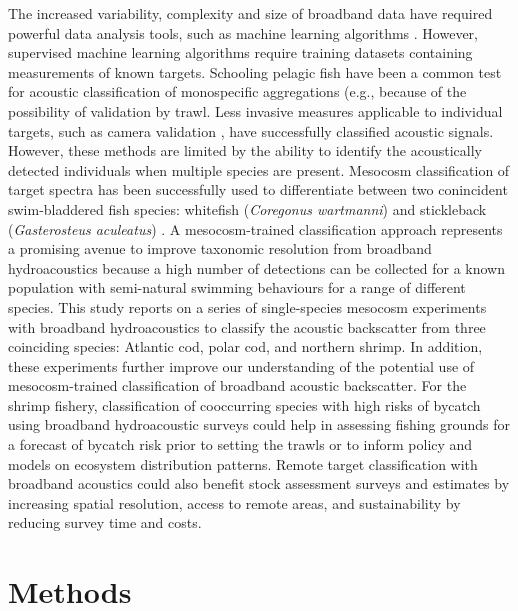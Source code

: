 The increased variability, complexity and size of broadband data have required powerful data analysis tools, such as machine learning algorithms \citep{Malde2020}. However, supervised machine learning algorithms require training datasets containing measurements of known targets. Schooling pelagic fish have been a common test for acoustic classification of monospecific aggregations (e.g., \citealt{Bassett2018, Brautaset2020, Fernandes2009} because of the possibility of validation by trawl. Less invasive measures applicable to individual targets, such as camera validation \citep{BenoitBird2020}, have successfully classified acoustic signals. However, these methods are limited by the ability to identify the acoustically detected individuals when multiple species are present. Mesocosm classification of target spectra has been successfully used to differentiate between two conincident swim-bladdered fish species: whitefish (\textit{Coregonus wartmanni}) and stickleback (\textit{Gasterosteus aculeatus}) \citep{Gugele2021}. A mesocosm-trained classification approach represents a promising avenue to improve taxonomic resolution from broadband hydroacoustics because a high number of detections can be collected for a known population with semi-natural swimming behaviours for a range of different species.
This study reports on a series of single-species mesocosm experiments with broadband hydroacoustics to classify the acoustic backscatter from three coinciding species: Atlantic cod, polar cod, and northern shrimp. In addition, these experiments further improve our understanding of the potential use of mesocosm-trained classification of broadband acoustic backscatter. For the shrimp fishery, classification of cooccurring species with high risks of bycatch using broadband hydroacoustic surveys could help in assessing fishing grounds for a forecast of bycatch risk prior to setting the trawls or to inform policy and models on ecosystem distribution patterns. Remote target classification with broadband acoustics could also benefit stock assessment surveys and estimates by increasing spatial resolution, access to remote areas, and sustainability by reducing survey time and costs.


\section{Methods}
